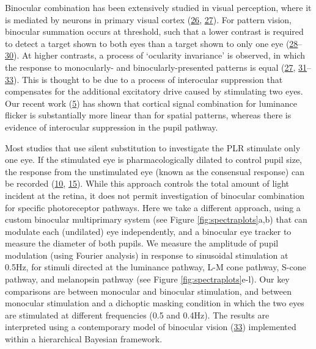 \documentclass[
]{article}
\begin{document}
Binocular combination has been extensively studied in visual perception, where it is mediated by neurons in primary visual cortex (\protect\hyperlink{ref-Hubel1962}{26}, \protect\hyperlink{ref-Moradi2009}{27}). For pattern vision, binocular summation occurs at threshold, such that a lower contrast is required to detect a target shown to both eyes than a target shown to only one eye (\protect\hyperlink{ref-Baker2018}{28}--\protect\hyperlink{ref-Legge1984}{30}). At higher contrasts, a process of `ocularity invariance' is observed, in which the response to monocularly- and binocularly-presented patterns is equal (\protect\hyperlink{ref-Moradi2009}{27}, \protect\hyperlink{ref-Baker2007}{31}--\protect\hyperlink{ref-Meese2006}{33}). This is thought to be due to a process of interocular suppression that compensates for the additional excitatory drive caused by stimulating two eyes. Our recent work (\protect\hyperlink{ref-Segala2023}{5}) has shown that cortical signal combination for luminance flicker is substantially more linear than for spatial patterns, whereas there is evidence of interocular suppression in the pupil pathway.

Most studies that use silent substitution to investigate the PLR stimulate only one eye. If the stimulated eye is pharmacologically dilated to control pupil size, the response from the unstimulated eye (known as the consensual response) can be recorded (\protect\hyperlink{ref-Spitschan2014}{10}, \protect\hyperlink{ref-McDougal2010}{15}). While this approach controls the total amount of light incident at the retina, it does not permit investigation of binocular combination for specific photoreceptor pathways. Here we take a different approach, using a custom binocular multiprimary system (see Figure \ref{fig:spectraplots}a,b) that can modulate each (undilated) eye independently, and a binocular eye tracker to measure the diameter of both pupils. We measure the amplitude of pupil modulation (using Fourier analysis) in response to sinusoidal stimulation at 0.5Hz, for stimuli directed at the luminance pathway, L-M cone pathway, S-cone pathway, and melanopsin pathway (see Figure \ref{fig:spectraplots}e-l). Our key comparisons are between monocular and binocular stimulation, and between monocular stimulation and a dichoptic masking condition in which the two eyes are stimulated at different frequencies (0.5 and 0.4Hz). The results are interpreted using a contemporary model of binocular vision (\protect\hyperlink{ref-Meese2006}{33}) implemented within a hierarchical Bayesian framework.
\end{document}
